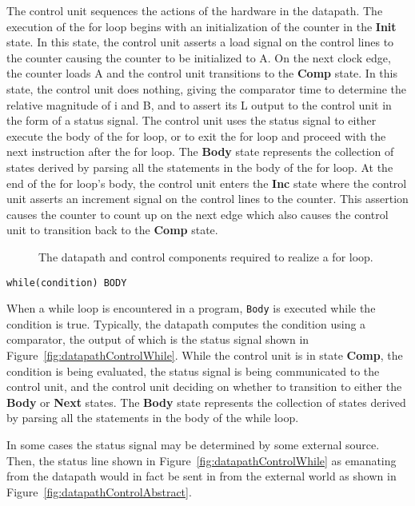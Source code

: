 \begin{description}
The control unit sequences the actions of the hardware in the
datapath.  The execution of the for loop begins with an 
initialization of the counter in the \textbf{ Init} state.  In this state,
the control unit asserts a load signal on the control lines to
the counter causing the counter to be initialized to A.  On the
next clock edge, the counter loads A and the control unit
transitions to the \textbf{ Comp} state.  In this state, the control unit
does nothing, giving the comparator time to determine the 
relative magnitude of i and B, and to assert its L output
to the control unit in the form of a status signal. The control
unit uses the status signal to either execute the body of 
the for loop, or to exit the for loop and proceed with
the next instruction after the for loop.  The \textbf{ Body} state 
represents the collection of states derived by parsing all 
the statements in the body of the for loop.  At the end of the 
for loop's body, the control unit enters the \textbf{ Inc} state where the 
control unit asserts an increment signal on the control lines 
to the counter.  This assertion causes the counter to count up on the 
next edge which also causes the control unit to transition
back to the \textbf{ Comp} state.

\begin{figure}[ht]
\caption{The datapath and control components required to realize
a for loop.}
\label{fig:datapathControlFor}
\end{figure}

\item[]\verb+while(condition) BODY+


When a while loop is encountered in a program, \verb^Body^ is executed 
while the condition is true.  Typically, 
the datapath computes the condition using a comparator, the 
output of which is the status signal shown in 
Figure~\ref{fig:datapathControlWhile}.  While the control unit is in state
\textbf{ Comp}, the condition is being evaluated, the status signal is
being communicated to the control unit, and the control unit 
deciding on whether to transition to either the \textbf{ Body} or 
\textbf{ Next} states.  The \textbf{ Body} state represents the 
collection of states derived by parsing all the statements 
in the body of the while loop.

In some cases the status signal may be determined by some external 
source.  Then, the status line shown in Figure~\ref{fig:datapathControlWhile} 
as emanating from the datapath would in fact be sent in from the 
external world as shown in Figure~\ref{fig:datapathControlAbstract}.


\end{description}
